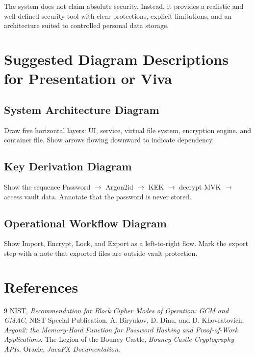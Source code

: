 \documentclass[12pt,a4paper]{report}
\begin{document}
The system does not claim absolute security. Instead, it provides a realistic and well-defined security tool with clear protections, explicit limitations, and an architecture suited to controlled personal data storage.

\appendix
\chapter{Suggested Diagram Descriptions for Presentation or Viva}
\section{System Architecture Diagram}
Draw five horizontal layers: UI, service, virtual file system, encryption engine, and container file. Show arrows flowing downward to indicate dependency.

\section{Key Derivation Diagram}
Show the sequence Password $\rightarrow$ Argon2id $\rightarrow$ KEK $\rightarrow$ decrypt MVK $\rightarrow$ access vault data. Annotate that the password is never stored.

\section{Operational Workflow Diagram}
Show Import, Encrypt, Lock, and Export as a left-to-right flow. Mark the export step with a note that exported files are outside vault protection.

\chapter{References}
\begin{thebibliography}{9}
 NIST, \textit{Recommendation for Block Cipher Modes of Operation: GCM and GMAC}, NIST Special Publication.
 A. Biryukov, D. Dinu, and D. Khovratovich, \textit{Argon2: the Memory-Hard Function for Password Hashing and Proof-of-Work Applications}.
 The Legion of the Bouncy Castle, \textit{Bouncy Castle Cryptography APIs}.
 Oracle, \textit{JavaFX Documentation}.
\end{thebibliography}
\end{document}
